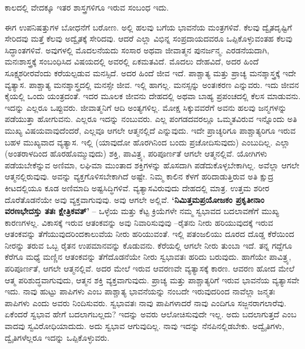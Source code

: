 ಕಾಲದಲ್ಲಿ ವೇದಕ್ಕೂ ಇತರ ಶಾಸ್ತ್ರಗಳಿಗೂ ಇರುವ ಸಂಬಂಧ ಇದು.

ಈಗ ಉಪನಿಷತ್ತುಗಳ ಬೋಧನೆಗೆ ಬರೋಣ. ಅಲ್ಲಿ ಹಲವು ಬಗೆಯ ಭಾವನೆಯ ಮಂತ್ರಗಳಿವೆ. ಕೆಲವು ದ್ವೈತದೃಷ್ಟಿಗೆ ಸೇರಿದವು ಮತ್ತೆ ಕೆಲವು ಅದ್ವೈತಕ್ಕೆ ಸೇರಿದವು. ಆದರೆ ಎಲ್ಲಾ ವಿಭಿನ್ನ ಸಂಪ್ರದಾಯದವರೂ ಒಪ್ಪಿಕೊಳ್ಳುವಂತಹ ಕೆಲವು ಸಿದ್ಧಾಂತಗಳಿವೆ. ಅವುಗಳಲ್ಲಿ ಮೊದಲನೆಯದು ಸಂಸಾರ ಅಥವಾ ಜೀವಾತ್ಮನ ಪುನರ್ಜನ್ಮ. ಎರಡನೆಯದಾಗಿ, ಮನಃಶಾಸ್ತ್ರಕ್ಕೆ ಸಂಬಂಧಿಸಿದ ವಿಷಯದಲ್ಲಿ ಅವರಲ್ಲಿ ಏಕಮತವಿದೆ. ಮೊದಲು ದೇಹವಿದೆ, ಅದರ ಹಿಂದೆ ಸೂಕ್ಷ್ಮಶರೀರವೆಂದು ಕರೆಯಲ್ಪಡುವ ಮನಸ್ಸಿದೆ. ಅದರ ಹಿಂದೆ ಜೀವ ಇದೆ. ಪಾಶ್ಚಾತ್ಯ ಮತ್ತು ಪ್ರಾಚ್ಯ ಮನಶ್ಶಾಸ್ತ್ರಕ್ಕೆ ಇದೇ ವ್ಯತ್ಯಾಸ. ಪಾಶ್ಚಾತ್ಯ ಮನಶ್ಶಾಸ್ತ್ರದಲ್ಲಿ ಮನಸ್ಸೇ ಜೀವ. ಇಲ್ಲಿ ಹಾಗಲ್ಲ. ಮನಸ್ಸನ್ನು ಅಂತಃಕರಣ ಎನ್ನುವರು. ಇದು ಜೀವನ ಕೈಯಲ್ಲಿ ಒಂದು ಯಂತ್ರದಂತೆ. ಇದರ ಮೂಲಕ ಜೀವನು ದೇಹದಲ್ಲಿ ಅಥವಾ ಬಾಹ್ಯ ಪ್ರಪಂಚದಲ್ಲಿ ಕೆಲಸ ಮಾಡುವನು. ಇದನ್ನು ಎಲ್ಲರೂ ಒಪ್ಪುವರು. ಜೀವಾತ್ಮನಿಗೆ ಆದಿ ಅಂತ್ಯಗಳಿಲ್ಲ. ಮೋಕ್ಷ ಸಿಕ್ಕುವವರೆಗೆ ಅವನು ಹಲವು ಜನ್ಮಗಳನ್ನು ಪಡೆಯುತ್ತಾ ಹೋಗುವನು. ಎಲ್ಲರೂ ಇದನ್ನು ನಂಬುವರು. ಎಲ್ಲ ಪಂಗಡದವರಲ್ಲೂ ಒಮ್ಮತವಿರುವ ಇನ್ನೊಂದು ಅತಿ ಮುಖ್ಯ ವಿಷಯವಾವುದೆಂದರೆ, ಎಲ್ಲವೂ ಆಗಲೇ ಆತ್ಮನಲ್ಲಿದೆ ಎನ್ನುವುದು. ಇದೇ ಪ್ರಾಚ್ಯರಿಗೂ ಪಾಶ್ಚಾತ್ಯರಿಗೂ ಇರುವ ಬಹಳ ಮುಖ್ಯವಾದ ವ್ಯತ್ಯಾಸ. ಇಲ್ಲಿ  (ಯಾವುದೋ ಹೊರಗಿನಿಂದ ಬಂದು ಪ್ರಚೋದಿಸುವುದು) ಎಂಬುದಿಲ್ಲ. ಎಲ್ಲಾ  (ಅಂತರಾಳದಿಂದ ಹೊರಹೊಮ್ಮುವುದು) ಶಕ್ತಿ, ಪಾವಿತ್ರ್ಯ, ಪರಿಪೂರ್ಣತೆ ಆಗಲೇ ಆತ್ಮನಲ್ಲಿವೆ. ಯೋಗಿಗಳು ಪಡೆಯಬೇಕೆನ್ನುವ ಅಣಿಮಾ, ಲಘಿಮಾ ಮುಂತಾದ ಶಕ್ತಿಗಳನ್ನು ಹೊಸದಾಗಿ ಪಡೆದುಕೊಳ್ಳಬೇಕಾಗಿಲ್ಲ. ಅವೆಲ್ಲಾ ಆಗಲೇ ಆತ್ಮನಲ್ಲಿರುವುವು. ಅವನ್ನು ವ್ಯಕ್ತಗೊಳಿಸಬೇಕಾಗಿದೆ ಅಷ್ಟೇ. ನಿಮ್ಮ ಕಾಲಿನ ಕೆಳಗೆ ಹರಿದಾಡುತ್ತಿರುವ ಅತಿ ಕ್ಷುದ್ರ ಕೀಟದಲ್ಲಿಯೂ ಕೂಡ ಅಣಿಮಾದಿ ಅಷ್ಟಸಿದ್ಧಿಗಳಿವೆ. ವ್ಯತ್ಯಾಸವಿರುವುದು ದೇಹದಲ್ಲಿ ಮಾತ್ರ. ಉತ್ತಮ ಶರೀರ ದೊರೆತೊಡನೆಯೇ ಅವು ವ್ಯಕ್ತವಾಗುವುವು. ಅವು ಆಗಲೇ ಅಲ್ಲಿವೆ. \textbf{‘ನಿಮಿತ್ತಮಪ್ರಯೋಜಕಂ ಪ್ರಕೃತೀನಾಂ ವರಣಭೇದಸ್ತು ತತಃ ಕ್ಷೇತ್ರಿಕವತ್​’} – ಒಳ್ಳೆಯ ಮತ್ತು ಕೆಟ್ಟ ಕ್ರಿಯೆಗಳೇ ನಮ್ಮ ಸ್ವಭಾವದ ಬದಲಾವಣೆಗೆ ಮುಖ್ಯ ಕಾರಣಗಳಲ್ಲ. ವಿಕಾಸಕ್ಕೆ ಇರುವ ಆತಂಕವನ್ನು ಅವು ನಿವಾರಿಸುವುವು –\break ರೈತನು ನೀರು ಹರಿಯುವುದಕ್ಕೆ ಇರುವ ಆತಂಕವನ್ನು ತೆಗೆಯುವುದರಿಂದ\break ಕಾಲುವೆಯ ನೀರು ಹರಿಯುವಂತೆ. ಇಲ್ಲಿ ಪತಂಜಲಿಯು ದೂರದ ದೊಡ್ಡ ಕೆರೆಯಿಂದ ನೀರನ್ನು ತರುವ ಒಬ್ಬ ರೈತನ ಉಪಮಾನವನ್ನು ಕೊಡುವನು. ಕೆರೆಯಲ್ಲಿ ಆಗಲೇ ನೀರು ತುಂಬಾ ಇದೆ. ತನ್ನ ಗದ್ದೆಗೂ ಕೆರೆಗೂ ಮಧ್ಯೆ ಮಣ್ಣಿನ ಆತಂಕವನ್ನು ತೆಗೆದೊಡನೆಯೇ ನೀರು ಸ್ವಭಾವತಃ ಹರಿದು ಬರುವುದು. ಹಾಗೆಯೇ ಪಾವಿತ್ರ್ಯ, ಪರಿಪೂರ್ಣತೆ, ಆಗಲೇ ಆತ್ಮನಲ್ಲಿವೆ. ಅದರ ಮೇಲೆ ಇರುವ ಆವರಣವೇ ವ್ಯತ್ಯಾಸಕ್ಕೆ ಕಾರಣ. ಆವರಣ ಹೋದ ಮೇಲೆ ಆತ್ಮ ಪರಿಶುದ್ಧವಾಗುವುದು, ಆತ್ಮನ ಶಕ್ತಿ ವ್ಯಕ್ತವಾಗುವುದು. ಪ್ರಾಚ್ಯ ಮತ್ತು ಪಾಶ್ಚಾತ್ಯರಿಗೆ ಇರುವ ಭಾವನೆಯ ವ್ಯತ್ಯಾಸವೇ ಇದು. ನಾವು ಹುಟ್ಟು ಪಾಪಿಗಳು ಎಂಬ ಪಾಶ್ಚಾತ್ಯ ಭಾವನೆಯನ್ನು ನಂಬದೇ ಇರುವುದರಿಂದ ನಾವೆಲ್ಲಾ ಜನ್ಮತಃ ಪಾಪಿಗಳು ಎಂದು ಅವರು ನಿಂದಿಸುವರು. ಸ್ವಭಾವತಃ ನಾವು ಪಾಪಿಗಳಾದರೆ ನಾವು ಎಂದಿಗೂ ಸಜ್ಜನರಾಗಲಾರೆವು. ಏಕೆಂದರೆ ಸ್ವಭಾವ ಹೇಗೆ ಬದಲಾಗಬಲ್ಲದು? ಇದನ್ನು ಅವರು ಆಲೋಚಿಸುವುದೇ ಇಲ್ಲ. ಅದು ಬದಲಾಗುತ್ತದೆ ಎಂಬ ವಾದವು ಸ್ವವಿರೋಧಿಯಾದುದು. ಅದು ಸ್ವಭಾವ ಆಗುವುದಿಲ್ಲ. ನಾವು ಇದನ್ನು ನೆನಪಿನಲ್ಲಿಡಬೇಕು. ಅದ್ವೈತಿಗಳು, ದ್ವೈತಿಗಳೆಲ್ಲರೂ ಇದನ್ನು ಒಪ್ಪಿಕೊಳ್ಳುವರು.

